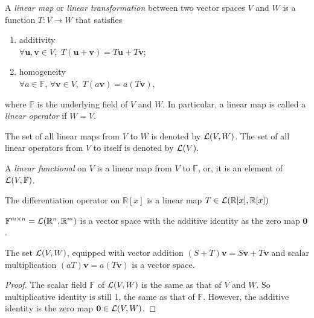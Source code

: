  \begin{defn}
   \label{def:linearMap}
   A \emph{linear map} or \emph{linear transformation}
    between two vector spaces $V$ and $W$
    is a function $T: V\rightarrow W$
    that satisfies
    \begin{enumerate}[(LNM-1)]\itemsep0em
      \itemsep0em
    \item additivity\\
      $\forall \mathbf{u}, \mathbf{v}\in V$,\ 
      $T(\mathbf{u}+\mathbf{v}) = T\mathbf{u} + T\mathbf{v}$;
    \item homogeneity\\
      $\forall a\in \mathbb{F}$, $\forall\mathbf{v}\in V$,\ 
      $T(a\mathbf{v})=a(T\mathbf{v})$,
    \end{enumerate}
    where $\mathbb{F}$ is the underlying field
    of $V$ and $W$.
   In particular, a linear map is called a \emph{linear operator}
    if $W=V$.
 \end{defn}

 \begin{ntn}
   The set of all linear maps from $V$ to $W$
    is denoted by ${\cal L}(V, W)$.
   The set of all linear operators from $V$ to itself
    is denoted by ${\cal L}(V)$.
 \end{ntn}

\begin{defn}
  \label{def:linearFunctional}
  A \emph{linear functional} on $V$ is a linear map
   from $V$ to $\mathbb{F}$,
   or, it is an element of ${\cal L}(V,\mathbb{F})$.
\end{defn}

 \begin{exm}
   \label{exm:polynomialDiffIsLinearMap}
   The differentiation operator on $\mathbb{R}[x]$
    is a linear map
    $T\in {\cal L}(\mathbb{R}[x],\mathbb{R}[x])$
  \end{exm}

\begin{exm}
  $\mathbb{F}^{m\times n}={\cal L}(\mathbb{R}^n, \mathbb{R}^m)$
  is a vector space with the additive identity
  as the zero map $\mathbf{0}$.
\end{exm}

 \begin{lem}
   The set ${\cal L}(V, W)$,
    equipped with
    vector addition
    \mbox{$(S+T)\mathbf{v} = S\mathbf{v}+ T\mathbf{v}$}
    and scalar multiplication
    $(aT)\mathbf{v}= a(T\mathbf{v})$
    is a vector space.
 \end{lem}
 \begin{proof}
   The scalar field $\mathbb{F}$ of ${\cal L}(V, W)$
    is the same as that of $V$ and $W$.
   So multiplicative identity is still 1,
    the same as that of $\mathbb{F}$.
   However, the additive identity is the zero map
   $\mathbf{0} \in {\cal L}(V, W)$.
 \end{proof}


